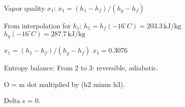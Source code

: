 Vapor quality \( x_1 \):  
\( x_1 = (h_1 - h_f) / (h_g - h_f) \)  

From interpolation for \( h_1 \):  
\( h_1 = h_f (-16^\circ C) = 203.3 \, \text{kJ/kg} \)  
\( h_g (-16^\circ C) = 287.7 \, \text{kJ/kg} \)  

\( x_1 = (h_1 - h_f) / (h_g - h_f) \)  
\( x_1 = 0.3076 \)

Entropy balance:  
From 2 to 3: reversible, adiabatic.  

O = m dot multiplied by (h2 minus h3).  

Delta s = 0.